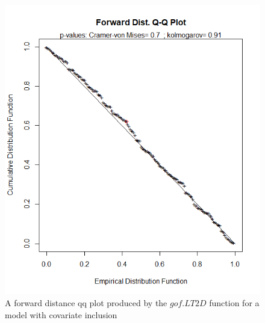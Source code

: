 \documentclass[11pt]{article}
\begin{document}
\begin{multicols}{2}
\begin{figure}[H]
\center
\includegraphics[scale=0.57]{gofy}
\caption{A forward distance qq plot produced by the $gof.LT2D$ function for a model with covariate inclusion}
\end{figure}


\end{multicols}
\end{document}
